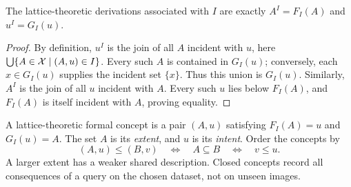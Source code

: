\begin{proposition}
      \label{prop:identification}
      The lattice-theoretic derivations associated with $I$ are exactly
      $A^{I}=F_{I}(A)$ and $u^{I}=G_{I}(u)$.
\end{proposition}
\begin{proof}
      By definition, $u^{I}$ is the join of all $A$ incident with $u$, here
      $\bigcup\{A\in\mathcal{X}\mid(A,u)\in I\}$. Every such $A$ is contained in
      $G_{I}(u)$; conversely, each $x\in G_{I}(u)$ supplies the incident set
      $\{x\}$. Thus this union is $G_{I}(u)$. Similarly, $A^{I}$ is the join
      of all $u$ incident with $A$. Every such $u$ lies below $F_{I}(A)$,
      and $F_{I}(A)$ is itself incident with $A$, proving equality.
\end{proof}

A lattice-theoretic formal concept is a pair $(A,u)$ satisfying
$F_{I}(A)=u$ and $G_{I}(u)=A$. The set $A$ is its \emph{extent}, and $u$
is its \emph{intent}. Order the concepts by
\begin{equation}\label{eq:concept-order}
      (A,u)\leq(B,v)\quad\Longleftrightarrow\quad
      A\subseteq B\quad\Longleftrightarrow\quad v\leq u.
\end{equation}
A larger extent has a weaker shared description. Closed concepts record
all consequences of a query on the chosen dataset, not on unseen images.

